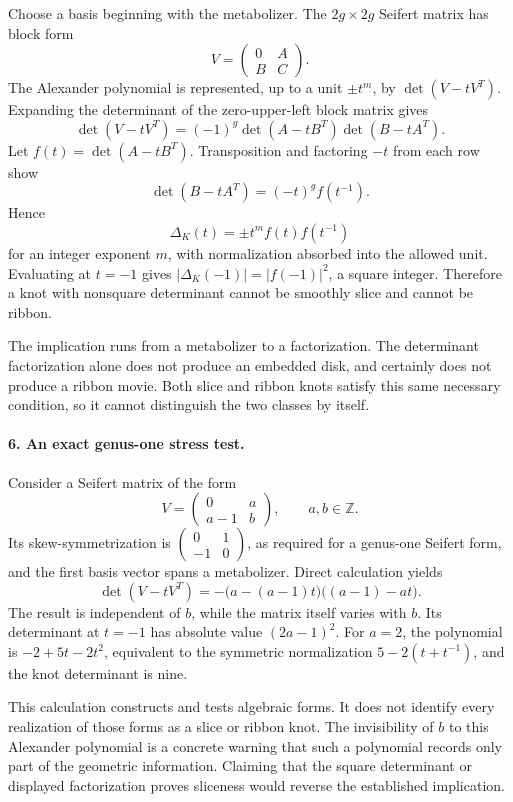 \documentclass[11pt]{article}
\begin{document}
Choose a basis beginning with the metabolizer. The $2g\times2g$ Seifert matrix has block form
\[
 V=\begin{pmatrix}0&A\\ B&C\end{pmatrix}.
\]
The Alexander polynomial is represented, up to a unit $\pm t^m$, by $\det(V-tV^T)$. Expanding the determinant of the zero-upper-left block matrix gives
\[
 \det(V-tV^T)=(-1)^g\det(A-tB^T)\det(B-tA^T).
\]
Let $f(t)=\det(A-tB^T)$. Transposition and factoring $-t$ from each row show
\[
 \det(B-tA^T)=(-t)^g f(t^{-1}).
\]
Hence
\[
 \Delta_K(t)=\pm t^m f(t)f(t^{-1})
\]
for an integer exponent $m$, with normalization absorbed into the allowed unit. Evaluating at $t=-1$ gives $|\Delta_K(-1)|=|f(-1)|^2$, a square integer. Therefore a knot with nonsquare determinant cannot be smoothly slice and cannot be ribbon.

The implication runs from a metabolizer to a factorization. The determinant factorization alone does not produce an embedded disk, and certainly does not produce a ribbon movie. Both slice and ribbon knots satisfy this same necessary condition, so it cannot distinguish the two classes by itself.

\paragraph{6. An exact genus-one stress test.}
Consider a Seifert matrix of the form
\[
 V=\begin{pmatrix}0&a\\a-1&b\end{pmatrix},\qquad a,b\in\mathbb Z.
\]
Its skew-symmetrization is $\left(\begin{smallmatrix}0&1\\-1&0\end{smallmatrix}\right)$, as required for a genus-one Seifert form, and the first basis vector spans a metabolizer. Direct calculation yields
\[
 \det(V-tV^T)
 =-\bigl(a-(a-1)t\bigr)\bigl((a-1)-at\bigr).
\]
The result is independent of $b$, while the matrix itself varies with $b$. Its determinant at $t=-1$ has absolute value $(2a-1)^2$. For $a=2$, the polynomial is $-2+5t-2t^2$, equivalent to the symmetric normalization $5-2(t+t^{-1})$, and the knot determinant is nine.

This calculation constructs and tests algebraic forms. It does not identify every realization of those forms as a slice or ribbon knot. The invisibility of $b$ to this Alexander polynomial is a concrete warning that such a polynomial records only part of the geometric information. Claiming that the square determinant or displayed factorization proves sliceness would reverse the established implication.
\end{document}
